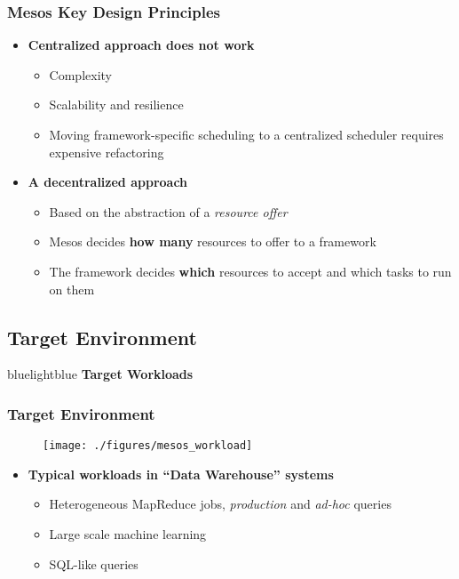 \begin{frame}
\frametitle{Mesos Key Design Principles}
\begin{itemize}
	\item {\bf Centralized approach does not work}
	\begin{itemize}
		\item Complexity
		\item Scalability and resilience
		\item Moving framework-specific scheduling to a centralized scheduler requires expensive refactoring
	\end{itemize}

\vspace{20pt}

	\item {\bf A decentralized approach}
	\begin{itemize}
		\item Based on the abstraction of a {\it resource offer}
		\item Mesos decides {\bf how many} resources to offer to a framework
		\item The framework decides {\bf which} resources to accept and which tasks to run on them
	\end{itemize}
\end{itemize}
\end{frame}

\subsection{Target Environment}
\begin{frame}
 \begin{colorblock}{blue}{lightblue}{ }
    \Large \textbf{Target Workloads}
  \end{colorblock}
\end{frame}

\begin{frame}
\frametitle{Target Environment}
\begin{figure}[h]
  \centering
  \texttt{[image: ./figures/mesos\_workload]}
  \label{fig:mesos_workload}
\end{figure}

\begin{itemize}
	\item {\bf Typical workloads in ``Data Warehouse'' systems}
	\begin{itemize}
		\item Heterogeneous MapReduce jobs, {\it production} and {\it ad-hoc} queries
		\item Large scale machine learning
		\item SQL-like queries
	\end{itemize}
\end{itemize}
\end{frame}

